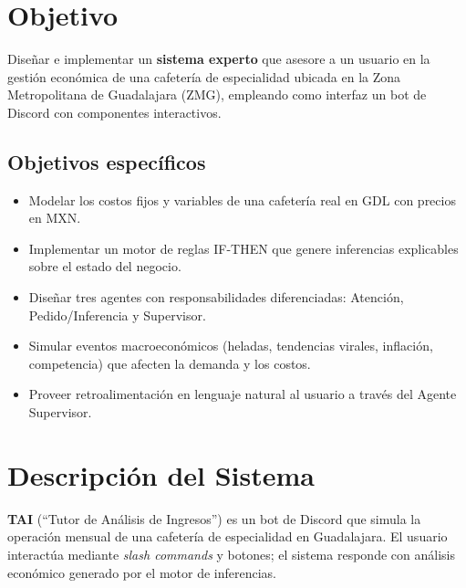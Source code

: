 \documentclass[12pt,spanish]{article}
\begin{document}
\tableofcontents
\newpage

\section{Objetivo}

Diseñar e implementar un \textbf{sistema experto} que asesore a un usuario
en la gestión económica de una cafetería de especialidad ubicada en la
Zona Metropolitana de Guadalajara (ZMG), empleando como interfaz un bot de
Discord con componentes interactivos.

\subsection*{Objetivos específicos}

\begin{itemize}[leftmargin=1.5em]
  \item Modelar los costos fijos y variables de una cafetería real en GDL
        con precios en MXN.
  \item Implementar un motor de reglas IF-THEN que genere inferencias
        explicables sobre el estado del negocio.
  \item Diseñar tres agentes con responsabilidades diferenciadas:
        Atención, Pedido/Inferencia y Supervisor.
  \item Simular eventos macroeconómicos (heladas, tendencias virales,
        inflación, competencia) que afecten la demanda y los costos.
  \item Proveer retroalimentación en lenguaje natural al usuario a través
        del Agente Supervisor.
\end{itemize}

\section{Descripción del Sistema}

\textbf{TAI} (``Tutor de Análisis de Ingresos'') es un bot de Discord que
simula la operación mensual de una cafetería de especialidad en Guadalajara.
El usuario interactúa mediante \emph{slash commands} y botones; el sistema
responde con análisis económico generado por el motor de inferencias.
\end{document}
